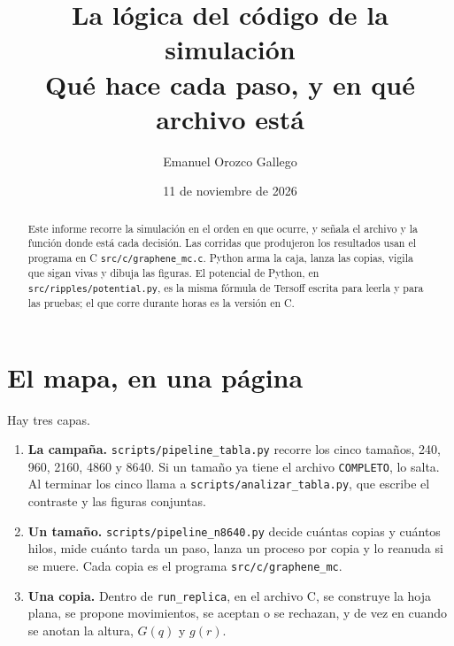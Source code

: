 \documentclass[11pt,a4paper]{article}
\title{La lógica del código de la simulación\\[0.35em]
\large Qué hace cada paso, y en qué archivo está}
\author{Emanuel Orozco Gallego}
\date{11 de noviembre de 2026}
\newcommand{\fn}[1]{\texttt{#1}}
\begin{document}
\maketitle

\begin{abstract}
Este informe recorre la simulación en el orden en que ocurre, y señala el archivo y la función donde está cada decisión. Las corridas que produjeron los resultados usan el programa en C \fn{src/c/graphene\_mc.c}. Python arma la caja, lanza las copias, vigila que sigan vivas y dibuja las figuras. El potencial de Python, en \fn{src/ripples/potential.py}, es la misma fórmula de Tersoff escrita para leerla y para las pruebas; el que corre durante horas es la versión en C.
\end{abstract}

\section{El mapa, en una página}

Hay tres capas.

\begin{enumerate}
\item \textbf{La campaña.} \fn{scripts/pipeline\_tabla.py} recorre los cinco tamaños, 240, 960, 2160, 4860 y 8640. Si un tamaño ya tiene el archivo \fn{COMPLETO}, lo salta. Al terminar los cinco llama a \fn{scripts/analizar\_tabla.py}, que escribe el contraste y las figuras conjuntas.
\item \textbf{Un tamaño.} \fn{scripts/pipeline\_n8640.py} decide cuántas copias y cuántos hilos, mide cuánto tarda un paso, lanza un proceso por copia y lo reanuda si se muere. Cada copia es el programa \fn{src/c/graphene\_mc}.
\item \textbf{Una copia.} Dentro de \fn{run\_replica}, en el archivo C, se construye la hoja plana, se propone movimientos, se aceptan o se rechazan, y de vez en cuando se anotan la altura, $G(q)$ y $g(r)$.
\end{enumerate}
\end{document}

